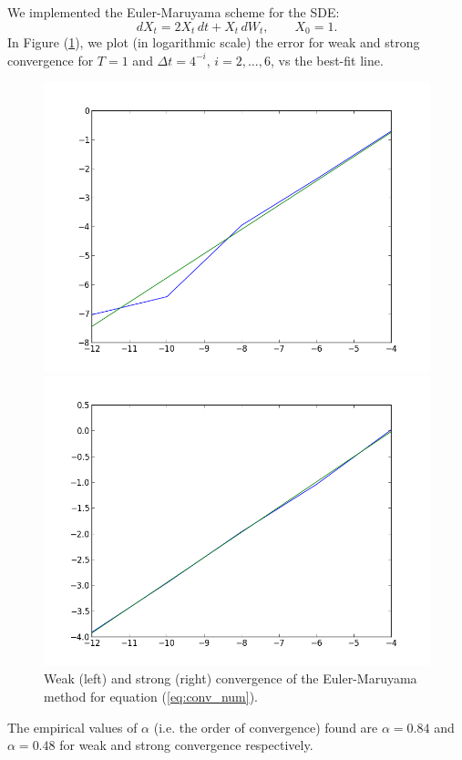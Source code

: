 \documentclass[a4paper,11pt]{article}
\theoremstyle{definition}
\theoremstyle{plain}
\theoremstyle{remark}
\begin{document}
We implemented the Euler-Maruyama scheme for the SDE:
\begin{equation}\label{eq:conv_num}
dX_t = 2X_t\,dt + X_t\,dW_t, \qquad X_0 = 1.
\end{equation}
In Figure (\ref{figure:ex10_em}), we plot (in logarithmic scale) the error for weak and strong convergence for $T=1$ and $\Delta t = 4^{-i}$, $i=2,\dots,6$, vs the best-fit line.
\begin{figure}[htbp]
\centering
\begin{minipage}[c]{.47\textwidth}
\includegraphics[width=\textwidth,
keepaspectratio]{ex10_em_w.png}
\end{minipage}
\hspace{4mm}
\begin{minipage}[c]{.47\textwidth}
\includegraphics[width=\textwidth,
keepaspectratio]{ex10_em_s.png}
\end{minipage}
\caption{ \label{figure:ex10_em} Weak (left) and strong (right) convergence of the Euler-Maruyama method for equation (\ref{eq:conv_num}).}
\end{figure}
The empirical values of $\alpha$ (i.e. the order of convergence) found are $\alpha = 0.84$ and $\alpha = 0.48$ for weak and strong convergence respectively.
\end{document}
